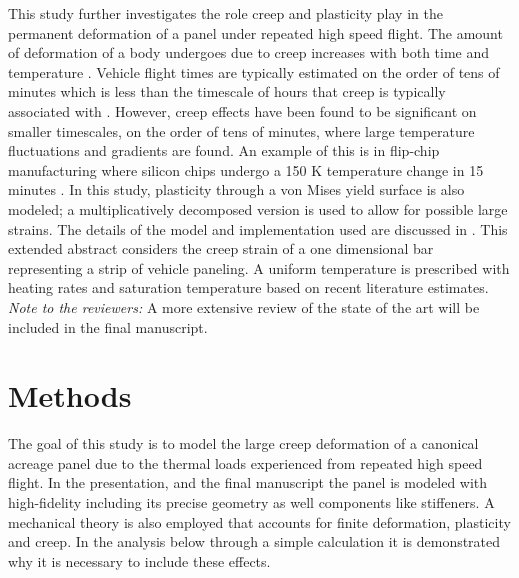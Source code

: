 \documentclass[conf]{new-aiaa}
\begin{document}
This study further investigates the role creep and plasticity play 
in the permanent deformation of a panel under repeated high speed flight.
The amount of deformation of a body undergoes due to creep increases 
with both time and temperature
\cite{roylance_mechanics_of_materials_text}. 
Vehicle flight times are typically estimated on the order
of tens of minutes 
\cite{ 
  kordes_structureal_heating_experiencs_on_the_x15_airplane,
  lafontaine_effects_of_strain_hardeing_on_response_of_skin_panels_in_hypersonic_flow,
  zuchowski_AVIATR_Predictive_capability_for_hypersonic_structural_response_and_life_prediction_phase_II}
which is less than the timescale of hours that creep is 
typically associated with 
\cite{ 
  lavina_creep_behavior_of_Ti6Al4V_from_450C_to_600C,
  evans_effects_of_alpha_case_formation_on_creep_fracture_properties_of_the_high_temperature_titanium_alloy_IMI834,
  roylance_mechanics_of_materials_text}.
However, creep effects have been found to be significant on smaller timescales,
on the order of tens of minutes,
where large temperature fluctuations and gradients are found.
An example of this is in flip-chip manufacturing 
where silicon chips undergo a 150 K temperature change 
in 15 minutes
\cite{ 
  li_simulation_of_finite_strain_inelastic_phenomena_governed_by_creep_and_plasticity}.
In this study, plasticity through a von Mises yield surface is also modeled;
a multiplicatively decomposed version is used to allow for 
possible large strains.
The details of the model and implementation used are
discussed in 
\cite{ li_simulation_of_finite_strain_inelastic_phenomena_governed_by_creep_and_plasticity}.
This extended abstract considers the creep strain of a one dimensional bar
representing a strip of vehicle paneling.
A uniform temperature is prescribed with heating rates and saturation 
temperature based on recent literature estimates.
\newline
\newline
\noindent
\emph{Note to the reviewers:} A more extensive review of the 
state of the art will be included in the 
final manuscript.

\section{Methods} \label{sec_methods}

The goal of this study is to model the large creep deformation of a canonical acreage
panel due to the thermal loads experienced from repeated high speed flight.
In the presentation, and the final manuscript the panel is modeled
with high-fidelity including its precise geometry as well components 
like stiffeners. 
A mechanical theory is also employed that accounts for finite 
deformation, plasticity and creep. 
In the analysis below through a simple calculation it is demonstrated
why it is necessary to include these effects. 
\end{document}
